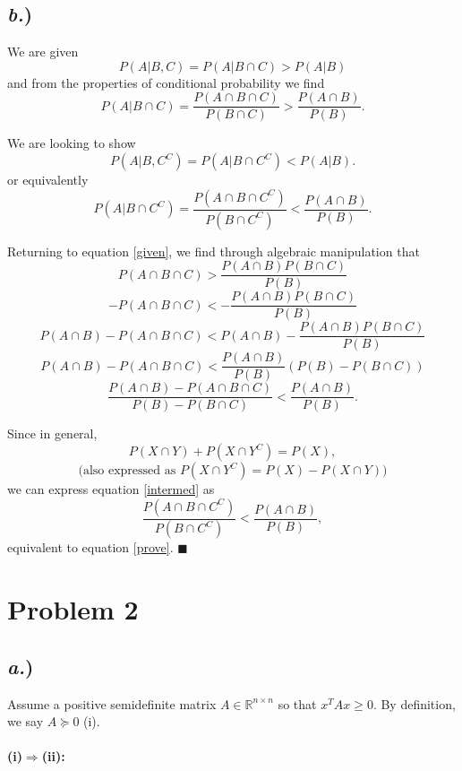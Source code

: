 \documentclass{report}
\begin{document}
\subsection*{\textit{b.})}
We are given $$P(A|B,C) = P(A|B \cap C) > P(A|B)$$
and from the properties of conditional probability we find \begin{equation} P(A|B \cap C) =\frac{P(A \cap B \cap C)}{P(B \cap C)} > \frac{P(A \cap B)}{P(B)}. \label{given}\end{equation}

We are looking to show $$P(A|B,C^{C}) = P(A|B \cap C^{C}) < P(A|B).$$
or equivalently \begin{equation}P(A|B \cap C^{C}) =\frac{P(A \cap B \cap C^{C})}{P(B \cap C^{C})} < \frac{P(A \cap B)}{P(B)}.\label{prove}\end{equation}

Returning to equation \ref{given}, we find through algebraic manipulation that
$$ P(A \cap B \cap C) > \frac{P(A \cap B) P(B \cap C)}{P(B)} $$
$$ -P(A \cap B \cap C) < -\frac{P(A \cap B) P(B \cap C)}{P(B)} $$
$$ P(A \cap B) - P(A \cap B \cap C) < P(A \cap B) - \frac{P(A \cap B) P(B \cap C)}{P(B)} $$
$$ P(A \cap B) - P(A \cap B \cap C) < \frac{P(A \cap B)}{P(B)}\left(P(B) - P(B \cap C)\right) $$
\begin{equation}\frac{P(A \cap B) - P(A \cap B \cap C)}{P(B) - P(B \cap C)} < \frac{P(A \cap B)}{P(B)}.\label{intermed}\end{equation}

Since in general,
$$ P(X \cap Y) + P(X \cap Y^{C}) = P(X), $$
$$ \text{(also expressed as }P(X \cap Y^{C}) = P(X) - P(X \cap Y)) $$
we can express equation \ref{intermed} as 
$$ \frac{P(A \cap B \cap C^{C})}{P(B \cap C^{C})} < \frac{P(A \cap B)}{P(B)}, $$
equivalent to equation \ref{prove}. $\blacksquare$



\newpage
\section*{Problem 2}

\subsection*{\textit{a.})}

Assume a positive semidefinite matrix $A \in \mathbb{R}^{n \times n}$ so that $x^TAx \geq 0$. By definition, we say $A \succeq 0$ (i).\\
\-\\
\textbf{(i)}$\bm{\Rightarrow}$\textbf{(ii):}
\end{document}
